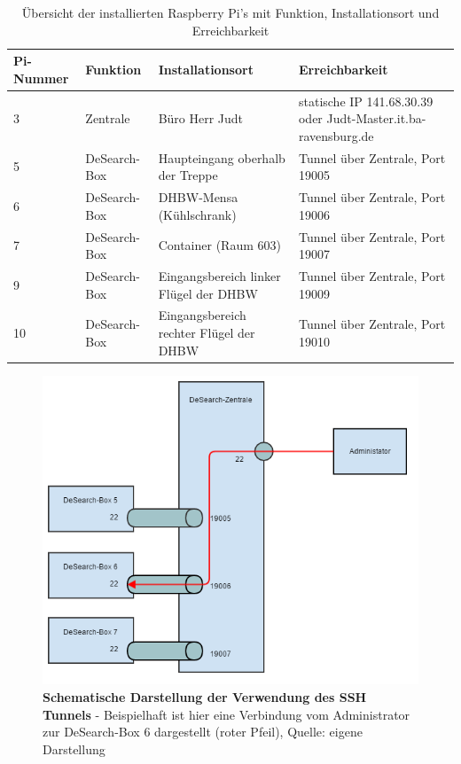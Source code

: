 \begin{table}[h]
	\begin{tabular}{ | p{} | p{} | p{4cm} | p{6cm} |}
		\hline
		\textbf{Pi-Nummer} & \textbf{Funktion} & \textbf{Installationsort} &  \textbf{Erreichbarkeit} \\ \hline
		3 & Zentrale & Büro Herr Judt & statische IP 141.68.30.39 oder \mbox{Judt-Master.it.ba-ravensburg.de} \\ \hline
		5 & DeSearch-Box & Haupteingang oberhalb der Treppe & Tunnel über Zentrale, Port 19005 \\ \hline
		6 & DeSearch-Box & DHBW-Mensa (Kühlschrank) & Tunnel über Zentrale, Port 19006 \\ \hline
		7 & DeSearch-Box & Container (Raum 603) & Tunnel über Zentrale, Port 19007 \\ \hline
		9 & DeSearch-Box & Eingangsbereich linker Flügel der DHBW & Tunnel über Zentrale, Port 19009 \\ \hline
		10 & DeSearch-Box & Eingangsbereich rechter Flügel der DHBW & Tunnel über Zentrale, Port 19010 \\ \hline
	\end{tabular}
	\caption{Übersicht der installierten Raspberry Pi's mit Funktion, Installationsort und Erreichbarkeit}
	\label{tab:pis}
\end{table}

\begin{figure}
	\centering
	\includegraphics[width=\textwidth]{images/tunnel.png}
	\caption[Schematische Darstellung der Verwendung des SSH Tunnels]{\textbf{Schematische Darstellung der Verwendung des SSH Tunnels} - Beispielhaft ist hier eine Verbindung vom Administrator zur DeSearch-Box 6 dargestellt (roter Pfeil), Quelle: eigene Darstellung}
	\label{fig:tunnel}
\end{figure}


